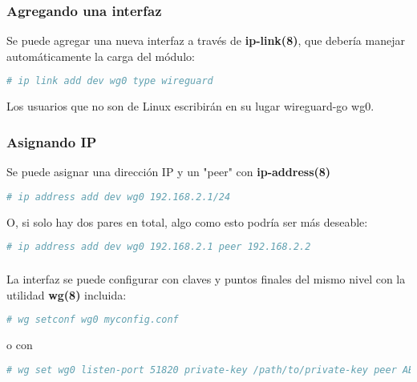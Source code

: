 \begin{frame}[fragile]
  \frametitle{Agregando una interfaz}

  Se puede agregar una nueva interfaz a través de \textbf{ip-link(8)},
  que debería manejar automáticamente la carga del módulo:

  \vspace{\baselineskip}
  \begin{lstlisting}[language=Bash]
  # ip link add dev wg0 type wireguard
  \end{lstlisting}

  Los usuarios que no son de Linux escribirán en su lugar wireguard-go wg0.
\end{frame}

\begin{frame}[fragile]
  \frametitle{Asignando IP}

  Se puede asignar una dirección IP y un "peer" con \textbf{ip-address(8)}

  \vspace{\baselineskip}
  \begin{lstlisting}[language=Bash]
  # ip address add dev wg0 192.168.2.1/24
  \end{lstlisting}

  \vspace{\baselineskip}
  O, si solo hay dos pares en total, algo como esto podría ser más deseable:

  \vspace{\baselineskip}
  \begin{lstlisting}[language=Bash]
  # ip address add dev wg0 192.168.2.1 peer 192.168.2.2
  \end{lstlisting}
\end{frame}

\begin{frame}[fragile]
  \frametitle{}

  La interfaz se puede configurar con claves y puntos finales del
  mismo nivel con la utilidad \textbf{wg(8)} incluida: 

  \vspace{\baselineskip}
  \begin{lstlisting}[language=Bash]
  # wg setconf wg0 myconfig.conf
  \end{lstlisting}

  \vspace{\baselineskip}
  o con

  \vspace{\baselineskip}
  \begin{lstlisting}[language=Bash]
  # wg set wg0 listen-port 51820 private-key /path/to/private-key peer ABCDEF... allowed-ips 192.168.88.0/24 endpoint 209.202.254.14:8172
  \end{lstlisting}
\end{frame}

